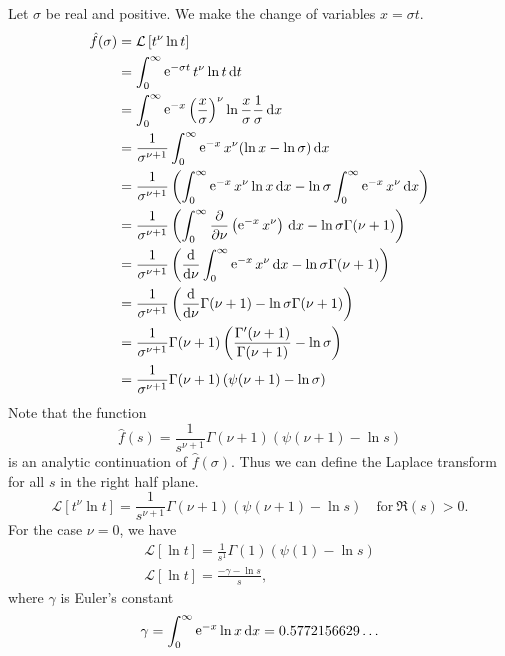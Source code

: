 {\begin{Solution}
  Let $\sigma$ be real and positive.  
  We make the change of variables $x = \sigma t$.
  \begin{align*}
    \hat{f}(\sigma) 
    &= \mathcal{L} \left[ t^\nu \ln t \right] \\
    &= \int_0^\infty \mathop{\mathrm{e}}\nolimits^{-\sigma t} t^\nu \ln t \,\mathrm{d} t \\
    &= \int_0^\infty \mathop{\mathrm{e}}\nolimits^{-x} \left( \frac{x}{\sigma} \right)^\nu 
    \ln \frac{x}{\sigma} \frac{1}{\sigma}\,\mathrm{d} x \\
    &= \frac{1}{\sigma^{\nu+1}} \int_0^\infty \mathop{\mathrm{e}}\nolimits^{-x} x^\nu ( \ln x - \ln \sigma ) \,\mathrm{d} x \\
    &= \frac{1}{\sigma^{\nu+1}} \left( \int_0^\infty \mathop{\mathrm{e}}\nolimits^{-x} x^\nu \ln x \,\mathrm{d} x
      - \ln \sigma \int_0^\infty \mathop{\mathrm{e}}\nolimits^{-x} x^\nu \,\mathrm{d} x \right) \\
    &= \frac{1}{\sigma^{\nu+1}} \left( \int_0^\infty \frac{\partial}{\partial \nu} \left( 
        \mathop{\mathrm{e}}\nolimits^{-x} x^\nu \right) \,\mathrm{d} x - \ln \sigma \Gamma(\nu+1) \right) \\
    &= \frac{1}{\sigma^{\nu+1}} \left( \frac{\mathrm{d}}{\mathrm{d} \nu} \int_0^\infty 
      \mathop{\mathrm{e}}\nolimits^{-x} x^\nu \,\mathrm{d} x - \ln \sigma \Gamma(\nu+1) \right) \\
    &= \frac{1}{\sigma^{\nu+1}} \left( \frac{\mathrm{d}}{\mathrm{d} \nu} \Gamma(\nu+1)
      - \ln \sigma \Gamma(\nu+1) \right) \\
    &= \frac{1}{\sigma^{\nu+1}} \Gamma(\nu+1) \left( \frac{\Gamma'(\nu+1)}
      {\Gamma(\nu+1)} - \ln \sigma \right) \\
    &= \frac{1}{\sigma^{\nu+1}} \Gamma(\nu+1) \left( \psi(\nu+1) - \ln \sigma \right) 
  \end{align*}
  Note that the function
  \[
  \hat{f}(s) = \frac{1}{s^{\nu+1}} \Gamma(\nu+1) \left( \psi(\nu+1) - \ln s \right) 
  \]
  is an analytic continuation of $\hat{f}(\sigma)$.  Thus we can define the Laplace
  transform for all $s$ in the right half plane.
  \[
  \boxed{
    \mathcal{L}[t^\nu \ln t] = \frac{1}{s^{\nu+1}} \Gamma(\nu+1) 
    \left( \psi(\nu+1) - \ln s \right) \quad \mathrm{for}\ \Re(s) > 0.
    }
  \]
  For the case $\nu = 0$, we have
  \begin{gather*}
    \mathcal{L}[\ln t] = \frac{1}{s^1} \Gamma(1) \left( \psi(1) - \ln s \right) \\
    \boxed{
      \mathcal{L}[\ln t] = \frac{-\gamma - \ln s}{s},
      }
  \end{gather*}
  where $\gamma$ is Euler's constant
  \[
  \gamma = \int_0^\infty \mathop{\mathrm{e}}\nolimits^{-x} \ln x \,\mathrm{d} x = 0.5772156629\ldots
  \]
\end{Solution}







}
